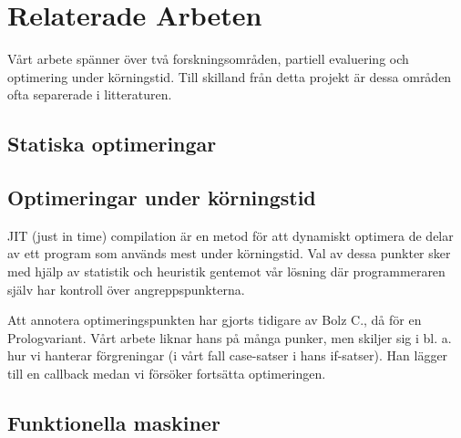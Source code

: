 \documentclass[Rapport]{subfiles}
\begin{document}
\section{Relaterade Arbeten}
Vårt arbete spänner över två forskningsområden, partiell evaluering
och optimering under körningstid. Till skilland från detta projekt 
är dessa områden ofta separerade i litteraturen.


\subsection{Statiska optimeringar}



\subsection{Optimeringar under körningstid}

JIT (just in time) compilation är en metod för att dynamiskt optimera
de delar av ett program som används mest under körningstid. Val av
dessa punkter sker med hjälp av statistik och heuristik gentemot vår
lösning där programmeraren själv har kontroll över angreppspunkterna. 

Att annotera optimeringspunkten har gjorts tidigare av Bolz C., då
för en Prologvariant.\cite{bolz-automatic} Vårt arbete liknar hans
på många punker, men skiljer sig i bl. a. hur vi hanterar förgreningar
(i vårt fall case-satser i hans if-satser). Han lägger till en callback
medan vi försöker fortsätta optimeringen.

\subsection{Funktionella maskiner}




\end{document}
